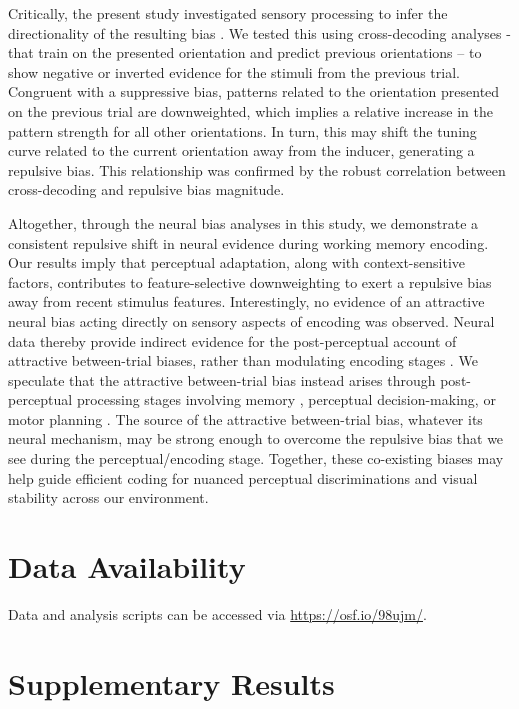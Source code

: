 \documentclass{article}
\begin{document}
Critically, the present study investigated sensory processing to infer the directionality of the resulting bias \parencite{Wolff2020}. We tested this using cross-decoding analyses - that train on the presented orientation and predict previous orientations – to show negative or inverted evidence for the stimuli from the previous trial. Congruent with a suppressive bias, patterns related to the orientation presented on the previous trial are downweighted, which implies a relative increase in the pattern strength for all other orientations. In turn, this may shift the tuning curve related to the current orientation away from the inducer, generating a repulsive bias. This relationship was confirmed by the robust correlation between cross-decoding and repulsive bias magnitude.

Altogether, through the neural bias analyses in this study, we demonstrate a consistent repulsive shift in neural evidence during working memory encoding. Our results imply that perceptual adaptation, along with context-sensitive factors, contributes to feature-selective downweighting to exert a repulsive bias away from recent stimulus features. Interestingly, no evidence of an attractive neural bias acting directly on sensory aspects of encoding was observed. Neural data thereby provide indirect evidence for the post-perceptual account of attractive between-trial biases, rather than modulating encoding stages \parencite{Fritsche2017, Bliss2017, Bae2020, Kim2020, Pascucci2019}. We speculate that the attractive between-trial bias instead arises through post-perceptual processing stages involving memory \parencite{Fritsche2017, Bliss2017}, perceptual decision-making, or motor planning \parencite{Machado2021, Sadil2021, Boettcher2021} . The source of the attractive between-trial bias, whatever its neural mechanism, may be strong enough to overcome the repulsive bias that we see during the perceptual/encoding stage. Together, these co-existing biases may help guide efficient coding for nuanced perceptual discriminations and visual stability across our environment.  

\section*{Data Availability}
Data and analysis scripts can be accessed via \href{https://osf.io/98ujm/}{https://osf.io/98ujm/}. 

\printbibliography

\section*{Supplementary Results}
\end{document}

